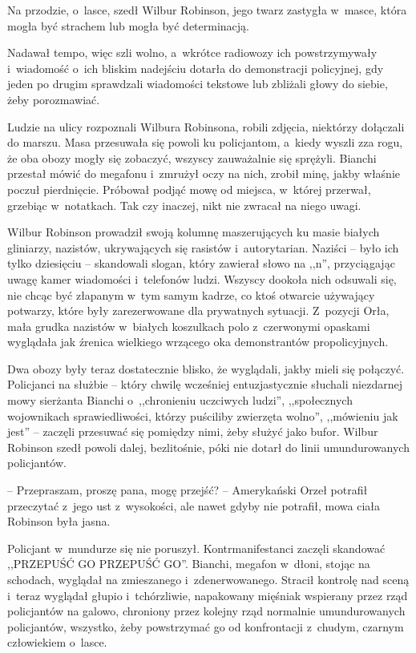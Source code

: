 \documentclass[oneside,polish,11pt,sfheadings]{mwbk}
\begin{document}
Na przodzie, o~lasce, szedł Wilbur Robinson, jego twarz zastygła w~masce, która mogła być strachem lub mogła być determinacją.

Nadawał tempo, więc szli wolno, a~wkrótce radiowozy ich powstrzymywały i~wiadomość o~ich bliskim nadejściu dotarła do demonstracji policyjnej,
gdy jeden po drugim sprawdzali wiadomości tekstowe lub zbliżali głowy do
siebie, żeby porozmawiać.

Ludzie na ulicy rozpoznali Wilbura Robinsona, robili zdjęcia, niektórzy
dołączali do marszu. Masa przesuwała się powoli ku policjantom, a~kiedy
wyszli zza rogu, że oba obozy mogły się zobaczyć, wszyscy zauważalnie
się sprężyli. Bianchi przestał mówić do megafonu i~zmrużył oczy na nich,
zrobił minę, jakby właśnie poczuł pierdnięcie. Próbował podjąć mowę od
miejsca, w~której przerwał, grzebiąc w~notatkach. Tak czy inaczej, nikt
nie zwracał na niego uwagi.

Wilbur Robinson prowadził swoją kolumnę maszerujących ku masie białych
gliniarzy, nazistów, ukrywających się rasistów i~autorytarian. Naziści -- było ich tylko dziesięciu -- skandowali slogan, który zawierał słowo na
,,n'', przyciągając uwagę kamer wiadomości i~telefonów ludzi. Wszyscy
dookoła nich odsuwali się, nie chcąc być złapanym w~tym samym kadrze, co
ktoś otwarcie używający potwarzy, które były zarezerwowane dla
prywatnych sytuacji. Z~pozycji Orła, mała grudka nazistów w~białych
koszulkach polo z~czerwonymi opaskami wyglądała jak źrenica wielkiego
wrzącego oka demonstrantów propolicyjnych.

Dwa obozy były teraz dostatecznie blisko, że wyglądali, jakby mieli się
połączyć. Policjanci na służbie -- który chwilę wcześniej entuzjastycznie
słuchali niezdarnej mowy sierżanta Bianchi o~,,chronieniu uczciwych
ludzi'', ,,społecznych wojownikach sprawiedliwości, którzy puściliby
zwierzęta wolno'', ,,mówieniu jak jest'' -- zaczęli przesuwać się
pomiędzy nimi, żeby służyć jako bufor. Wilbur Robinson szedł powoli
dalej, bezlitośnie, póki nie dotarł do linii umundurowanych policjantów.

-- Przepraszam, proszę pana, mogę przejść? -- Amerykański Orzeł potrafił
przeczytać z~jego ust z~wysokości, ale nawet gdyby nie potrafił, mowa
ciała Robinson była jasna.

Policjant w~mundurze się nie poruszył. Kontrmanifestanci zaczęli
skandować ,,PRZEPUŚĆ GO PRZEPUŚĆ GO''. Bianchi, megafon w~dłoni, stojąc
na schodach, wyglądał na zmieszanego i~zdenerwowanego. Stracił kontrolę
nad sceną i~teraz wyglądał głupio i~tchórzliwie, napakowany mięśniak
wspierany przez rząd policjantów na galowo, chroniony przez kolejny rząd
normalnie umundurowanych policjantów, wszystko, żeby powstrzymać go od
konfrontacji z~chudym, czarnym człowiekiem o~lasce.
\end{document}
